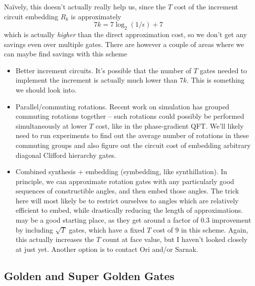 \documentclass{article}
\theoremstyle{definition}
\theoremstyle{theorem}
\theoremstyle{remark}
\begin{document}
Na\"ively, this doesn't actually really help us, since the $T$ cost of the increment circuit embedding $R_k$ is approximately 
\[
	7k = 7\log_2(1/\epsilon) + 7
\]
which is actually \emph{higher} than the direct approximation cost, so we don't get any savings even over multiple gates. There are however a couple of areas where we can maybe find savings with this scheme
\begin{itemize}
	\item Better increment circuits. It's possible that the number of $T$ gates needed to implement the increment is actually much lower than $7k$. This is something we should look into.
	\item Parallel/commuting rotations. Recent work on simulation \cite{grouped} has grouped commuting rotations together -- such rotations could possibly be performed simultaneously at lower $T$ cost, like in the phase-gradient QFT. We'll likely need to run experiments to find out the average number of rotations in these commuting groups and also figure out the circuit cost of embedding arbitrary diagonal Clifford hierarchy gates.
	\item Combined synthesis + embedding (symbedding, like synthillation). In principle, we can approximate rotation gates with any particularly good sequences of constructible angles, and then embed those angles. The trick here will most likely be to restrict ourselves to angles which are relatively efficient to embed, while drastically reducing the length of approximations. \cite{hierarchysynth} may be a good starting place, as they get around a factor of 0.3 improvement by including $\sqrt{T}$ gates, which have a fixed $T$ cost of $9$ in this scheme. Again, this actually increases the $T$ count at face value, but I haven't looked closely at \cite{hierarchysynth} just yet. Another option is to contact Ori and/or Sarnak.
\end{itemize}

\subsection{Golden and Super Golden Gates}
\end{document}

